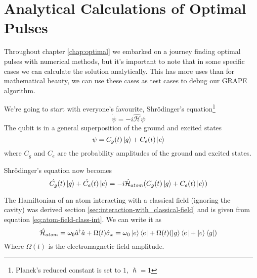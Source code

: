 \chapter{Analytical Calculations of Optimal Pulses} \label{appen:annalytic}
Throughout chapter \ref{chap:optimal} we embarked on a journey finding optimal pulses with numerical methods, but it's important to note that in some specific cases we can calculate the solution analytically. This has more uses than for mathematical beauty, we can use these cases as test cases to debug our GRAPE algorithm.

We're going to start with everyone's favourite, Shr\"{o}dinger's equation\footnote{Planck's reduced constant is set to $1$, $\hslash = 1$}
\[
    \dot{\psi} = -i \hat{\mathcal{H}} \psi
\]
The qubit is in a general superposition of the ground and excited states
\[
    \psi = C_g (t) \ket{g} + C_e (t) \ket{e}
\]
where $C_g$ and $C_e$ are the probability amplitudes of the ground and excited states.

Shr\"{o}dinger's equation now becomes
\begin{equation} \label{eq:shrod-psi-explit}
     \dot{C_g} (t) \ket{g} + \dot{C_e} (t) \ket{e} = -i \hat{\mathcal{H}}_{atom}  (C_g (t) \ket{g} + C_e (t) \ket{e})
\end{equation}

The Hamiltonian of an atom interacting with a classical field (ignoring the cavity) was derived section \ref{sec:interaction-with_classical-field} and is given from equation \ref{eq:atom-field-class-int}. We can write it as
\[
    \hat{\mathcal{H}}_{atom} = \omega_0 \hat{a}^\dag \hat{a} + \Omega (t)\hat{\sigma}_x= \omega_0\ket{e}\bra{e} + \Omega (t) (\ket{g}\bra{e} + \ket{e}\bra{g})
\]
Where $\Omega (t)$ is the electromagnetic field amplitude.

